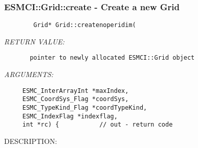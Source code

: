  
\setlength{\oldparskip}{\parskip}
\setlength{\parskip}{1.5ex}
\setlength{\oldparindent}{\parindent}
\setlength{\parindent}{0pt}
\setlength{\oldbaselineskip}{\baselineskip}
\setlength{\baselineskip}{11pt}
 
\def\bv{\begin{verbatim}}
\def\ev{\end{verbatim}}
\def\be{\begin{equation}}
\def\ee{\end{equation}}
\def\bea{\begin{eqnarray}}
\def\eea{\end{eqnarray}}
\def\bi{\begin{itemize}}
\def\ei{\end{itemize}}
\def\bn{\begin{enumerate}}
\def\en{\end{enumerate}}
\def\bd{\begin{description}}
\def\ed{\end{description}}
\def\({\left (}
\def\){\right )}
\def\[{\left [}
\def\]{\right ]}
\def\<{\left  \langle}
\def\>{\right \rangle}
\def\cI{{\cal I}}
\def\diag{\mathop{\rm diag}}
\def\tr{\mathop{\rm tr}}


 
\subsubsection [ESMCI::Grid::create] {ESMCI::Grid::create - Create a new Grid}


  
\begin{verbatim}        Grid* Grid::createnoperidim(\end{verbatim}{\em RETURN VALUE:}
\begin{verbatim}       pointer to newly allocated ESMCI::Grid object\end{verbatim}{\em ARGUMENTS:}
\begin{verbatim}     ESMC_InterArrayInt *maxIndex, 
     ESMC_CoordSys_Flag *coordSys,
     ESMC_TypeKind_Flag *coordTypeKind,
     ESMC_IndexFlag *indexflag,
     int *rc) {           // out - return code\end{verbatim}
{\sf DESCRIPTION:\\ }



